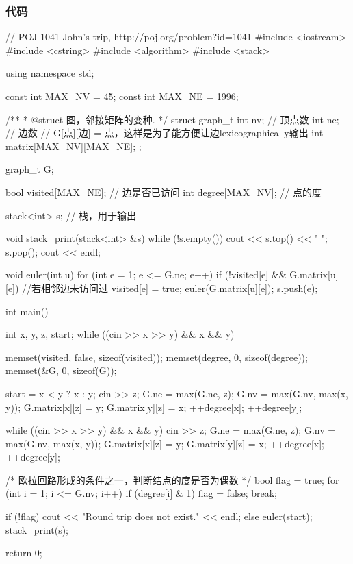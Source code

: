 \subsubsection{代码}
\begin{Codex}[label=round_trip.cpp]
// POJ 1041 John's trip, http://poj.org/problem?id=1041
#include <iostream>
#include <cstring>
#include <algorithm>
#include <stack>

using namespace std;

const int MAX_NV = 45;
const int MAX_NE = 1996;

/**
 * @struct 图，邻接矩阵的变种.
 */
struct graph_t {
    int nv; // 顶点数
    int ne; // 边数
    // G[点][边] = 点，这样是为了能方便让边lexicographically输出
    int matrix[MAX_NV][MAX_NE];
};

graph_t G;

bool visited[MAX_NE];  // 边是否已访问
int degree[MAX_NV];    // 点的度

stack<int> s;  // 栈，用于输出

void stack_print(stack<int> &s) {
    while (!s.empty()) {
        cout << s.top() << " ";
        s.pop();
    }
    cout << endl;
}

void euler(int u) {
    for (int e = 1; e <= G.ne; e++) {
        if (!visited[e] && G.matrix[u][e]) { //若相邻边未访问过
            visited[e] = true;
            euler(G.matrix[u][e]);
            s.push(e);
        }
    }
}

int main() {
    int x, y, z, start;
    while ((cin >> x >> y) && x && y) {
        memset(visited, false, sizeof(visited));
        memset(degree, 0, sizeof(degree));
        memset(&G, 0, sizeof(G));

        start = x < y ? x : y;
        cin >> z;
        G.ne = max(G.ne, z);
        G.nv = max(G.nv, max(x, y));
        G.matrix[x][z] = y;
        G.matrix[y][z] = x;
        ++degree[x];
        ++degree[y];

        while ((cin >> x >> y) && x && y) {
            cin >> z;
            G.ne = max(G.ne, z);
            G.nv = max(G.nv, max(x, y));
            G.matrix[x][z] = y;
            G.matrix[y][z] = x;
            ++degree[x];
            ++degree[y];
        }

        /* 欧拉回路形成的条件之一，判断结点的度是否为偶数 */
        bool flag = true;
        for (int i = 1; i <= G.nv; i++) {
            if (degree[i] & 1) {
                flag = false;
                break;
            }
        }

        if (!flag) {
            cout << "Round trip does not exist." << endl;
        } else {
            euler(start);
            stack_print(s);
        }
    }
    return 0;
}
\end{Codex}


